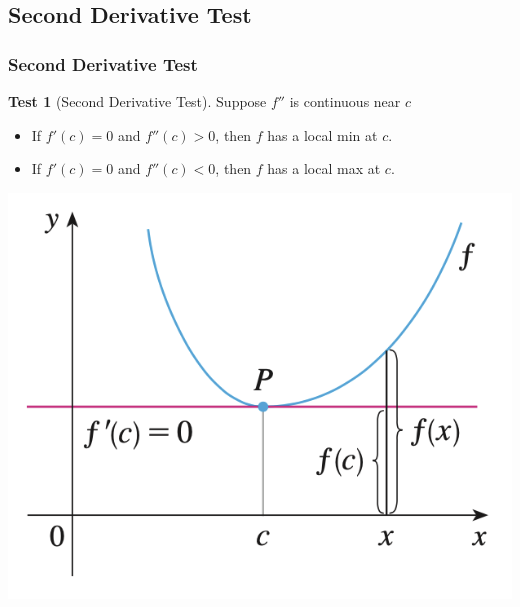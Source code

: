 \documentclass[t]{beamer}
\theoremstyle{plain}
\theoremstyle{definition}
\newtheorem{test}{Test}
\begin{document}
\subsection{Second Derivative Test}
\begin{frame}
\frametitle{Second Derivative Test}
\footnotesize
\begin{test}[Second Derivative Test]
Suppose $f''$ is continuous near $c$
	\begin{itemize}
		\item If $f'(c) = 0$ and $f''(c) > 0$, then $f$ has a local min at $c$.
		\item If $f'(c) = 0$ and $f''(c) < 0$, then $f$ has a local max at $c$.
	\end{itemize}
\end{test}

\vspace{1em}
\centering
\includegraphics[scale=0.40]{fig/secondtest}

\end{frame}
\end{document}
